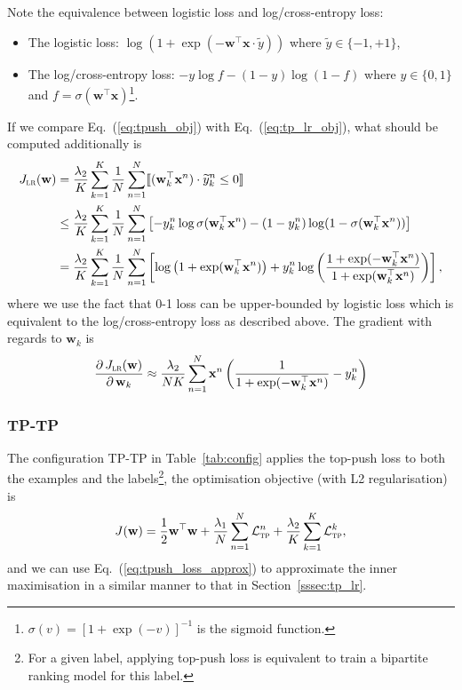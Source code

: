 \documentclass[9pt]{extarticle}
\newcommand{\llb}{\llbracket}
\newcommand{\rrb}{\rrbracket}
\newcommand{\x}{\mathbf{x}}
\newcommand{\1}{\mathbf{1}}
\newcommand{\w}{\mathbf{w}}
\newcommand{\LCal}{\mathcal{L}}
\begin{document}
Note the equivalence between logistic loss and log/cross-entropy loss:
\begin{itemize}
\item The logistic loss: $\log(1 + \exp(-\w^\top \x \cdot \widetilde{y}))$ where $\widetilde{y} \in \{-1, +1\}$,
\item The log/cross-entropy loss: $ -y \log f - (1-y) \log(1-f)$ where $y \in \{0, 1\}$ and $f = \sigma(\w^\top \x)$\footnote{
$\sigma(v) = [1 + \exp(-v)]^{-1}$ is the sigmoid function.}.
\end{itemize}

If we compare Eq.~(\ref{eq:tpush_obj}) with Eq.~(\ref{eq:tp_lr_obj}), what should be computed additionally is
\begin{align*}
J_\textsc{lr}(\w) 
&= \frac{\lambda_2}{K} \sum_{k=1}^K \frac{1}{N} \sum_{n=1}^N \llb (\w_k^\top \x^n) \cdot \widetilde{y}_k^n \le 0 \rrb \\
&\le \frac{\lambda_2}{K} \sum_{k=1}^K \frac{1}{N} \sum_{n=1}^N 
     \left[ -y_k^n \log \sigma(\w_k^\top \x^n) - (1 - y_k^n) \log (1 - \sigma(\w_k^\top \x^n)) \right] \\
&= \frac{\lambda_2}{K} \sum_{k=1}^K \frac{1}{N} \sum_{n=1}^N
   \left[ \log \left( 1 + \exp(\w_k^\top \x^n) \right) + 
          y_k^n \log \left( \frac{1 + \exp(-\w_k^\top \x^n)} {1 + \exp(\w_k^\top \x^n)} \right) \right],
\end{align*}
where we use the fact that 0-1 loss can be upper-bounded by logistic loss which is equivalent to the log/cross-entropy loss as described above.
The gradient with regards to $\w_k$ is
$$
\frac{\partial \, J_\textsc{lr}(\w)} {\partial \, \w_k}
\approx \frac{\lambda_2}{NK} \sum_{n=1}^N \x^n \left( \frac{1}{1 + \exp(-\w_k^\top \x^n)} - y_k^n \right)
$$


\subsubsection{TP-TP}
\label{sssec:tp_tp}

The configuration TP-TP in Table~\ref{tab:config} applies the top-push loss to both the examples and 
the labels\footnote{For a given label, applying top-push loss is equivalent to train a bipartite ranking model for this label.},
the optimisation objective (with L2 regularisation) is
\begin{equation}
\label{eq:tp_tp_obj}
J(\w) = \frac{1}{2} \w^\top \w + \frac{\lambda_1}{N} \sum_{n=1}^N \LCal_\textsc{tp}^n + \frac{\lambda_2}{K} \sum_{k=1}^K \LCal_\textsc{tp}^k,
\end{equation}
and we can use Eq.~(\ref{eq:tpush_loss_approx}) to approximate the inner maximisation in a similar manner to that in Section~\ref{sssec:tp_lr}.
\end{document}
